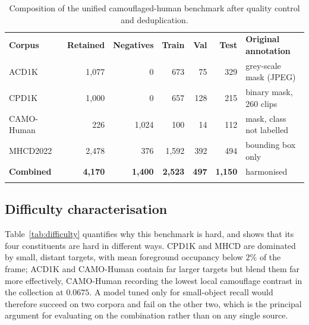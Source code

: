 \documentclass[3p,times,procedia]{elsarticle}
\begin{document}
\begin{table}[h]
\caption{Composition of the unified camouflaged-human benchmark after quality control and deduplication.}
\label{tab:composition}
\begin{tabular*}{\hsize}{@{\extracolsep{\fill}}lrrrrrl@{}}
\toprule
\textbf{Corpus} & \textbf{Retained} & \textbf{Negatives} & \textbf{Train} & \textbf{Val} & \textbf{Test} & \textbf{Original annotation} \\
\colrule
ACD1K~\cite{acd1k}      & 1{,}077 & 0       & 673   & 75  & 329   & grey-scale mask (JPEG) \\
CPD1K~\cite{ddcn}       & 1{,}000 & 0       & 657   & 128 & 215   & binary mask, 260 clips \\
CAMO-Human~\cite{camo}  & 226     & 1{,}024 & 100   & 14  & 112   & mask, class not labelled \\
MHCD2022~\cite{mhnet}   & 2{,}478 & 376     & 1{,}592 & 392 & 494 & bounding box only \\
\colrule
\textbf{Combined}       & \textbf{4{,}170} & \textbf{1{,}400} & \textbf{2{,}523} & \textbf{497} & \textbf{1{,}150} & harmonised \\
\botrule
\end{tabular*}
\end{table}

\subsection{Difficulty characterisation}

Table~\ref{tab:difficulty} quantifies why this benchmark is hard, and shows that its four constituents are hard in different ways. CPD1K and MHCD are dominated by small, distant targets, with mean foreground occupancy below $2\%$ of the frame; ACD1K and CAMO-Human contain far larger targets but blend them far more effectively, CAMO-Human recording the lowest local camouflage contrast in the collection at $0.0675$. A model tuned only for small-object recall would therefore succeed on two corpora and fail on the other two, which is the principal argument for evaluating on the combination rather than on any single source.
\end{document}
